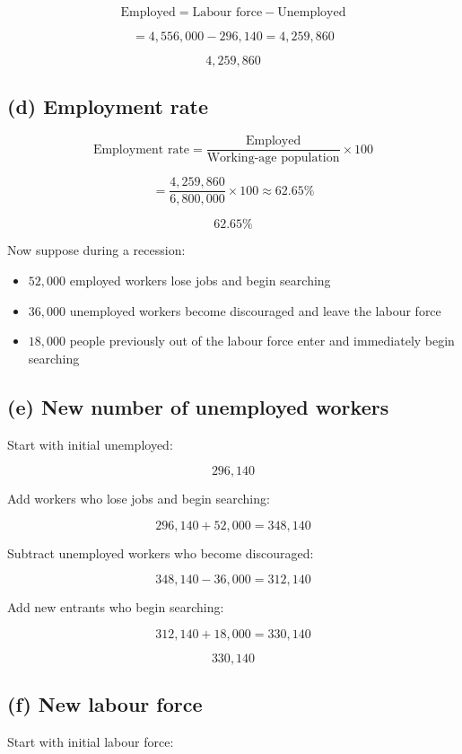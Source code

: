\documentclass[12pt]{article}
\begin{document}
\[
\text{Employed} = \text{Labour force} - \text{Unemployed}
\]

\[
= 4{,}556{,}000 - 296{,}140 = 4{,}259{,}860
\]

\[
\boxed{4{,}259{,}860}
\]

\subsection*{(d) Employment rate}

\[
\text{Employment rate}=\frac{\text{Employed}}{\text{Working-age population}}\times 100
\]

\[
=\frac{4{,}259{,}860}{6{,}800{,}000}\times 100 \approx 62.65\%
\]

\[
\boxed{62.65\%}
\]

Now suppose during a recession:

\begin{itemize}
    \item \(52{,}000\) employed workers lose jobs and begin searching
    \item \(36{,}000\) unemployed workers become discouraged and leave the labour force
    \item \(18{,}000\) people previously out of the labour force enter and immediately begin searching
\end{itemize}

\subsection*{(e) New number of unemployed workers}

Start with initial unemployed:

\[
296{,}140
\]

Add workers who lose jobs and begin searching:

\[
296{,}140 + 52{,}000 = 348{,}140
\]

Subtract unemployed workers who become discouraged:

\[
348{,}140 - 36{,}000 = 312{,}140
\]

Add new entrants who begin searching:

\[
312{,}140 + 18{,}000 = 330{,}140
\]

\[
\boxed{330{,}140}
\]

\subsection*{(f) New labour force}

Start with initial labour force:
\end{document}

